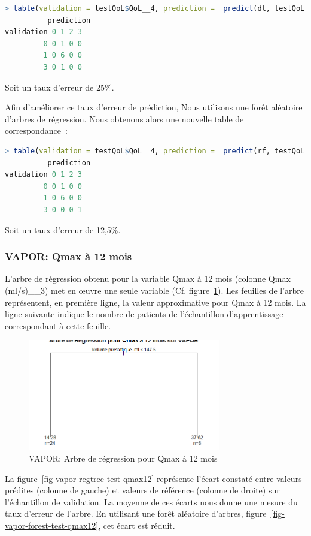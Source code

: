 \begin{lstlisting}[language=R]
> table(validation = testQoL$QoL__4, prediction =  predict(dt, testQoL, type="class"))
          prediction
validation 0 1 2 3
         0 0 1 0 0
         1 0 6 0 0
         3 0 1 0 0
\end{lstlisting}
Soit un taux d'erreur de 25\%.

Afin d'améliorer ce taux d'erreur de prédiction, Nous utilisons une forêt aléatoire d'arbres de régression. Nous obtenons alors une nouvelle table de correspondance~:

\begin{lstlisting}[language=R]
> table(validation = testQoL$QoL__4, prediction =  predict(rf, testQoL))
          prediction
validation 0 1 2 3
         0 0 1 0 0
         1 0 6 0 0
         3 0 0 0 1
\end{lstlisting}
Soit un taux d'erreur de 12,5\%.


\subsubsection{VAPOR: Qmax à 12 mois}

L'arbre de régression obtenu pour la variable Qmax à 12 mois (colonne Qmax (ml/s)\_\_3) met en {\oe}uvre une seule variable (Cf. figure~\ref{fig-vapor-regtree-qmax12}). Les feuilles de l'arbre représentent, en première ligne, la valeur approximative pour Qmax à 12 mois. La ligne suivante indique le nombre de patients de l'échantillon d'apprentissage correspondant à cette feuille. 

\begin{figure}[H]
\centering
\includegraphics[width=0.75\textwidth]{../Fig/VAPOR/vapor-regtree-qmax12.png}
\caption{VAPOR: Arbre de régression pour Qmax à 12 mois}
\label{fig-vapor-regtree-qmax12}
\end{figure}

La figure~\ref{fig-vapor-regtree-test-qmax12} représente l'écart constaté entre valeurs prédites (colonne de gauche) et valeurs de référence (colonne de droite) sur l'échantillon de validation. La moyenne de ces écarts nous donne une mesure du taux d'erreur de l'arbre. En utilisant une forêt aléatoire d'arbres, figure~\ref{fig-vapor-forest-test-qmax12}, cet écart est réduit.

